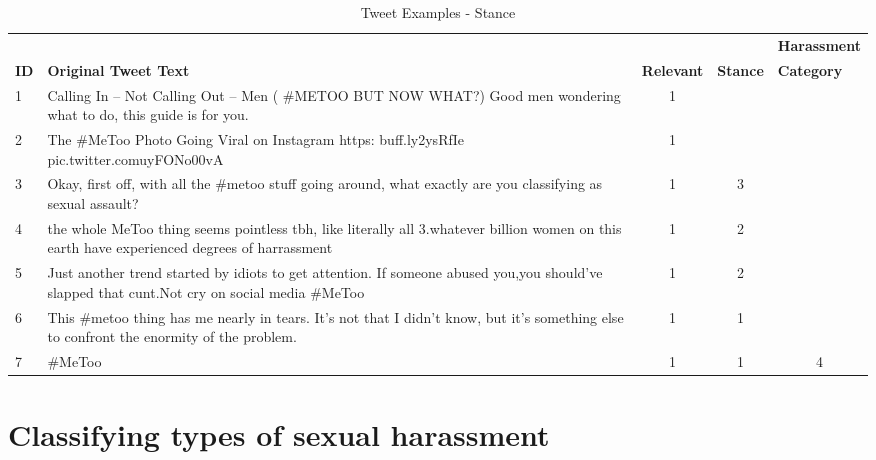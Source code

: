 \begin{table}[H]
    \centering
    \caption{Tweet Examples - Stance}
    \begin{tabular}{m{1cm} m{8cm} m{1.5cm} m{1.1cm} m{2.1cm}}
        \toprule
        & {} & {} & {} & {\textbf{Harassment}} \\
        \rowcolor{White}\textbf{ID} & {\textbf{Original Tweet Text}} & {\textbf{Relevant}} & {\textbf{Stance}} & {\textbf{Category}} \\
                \midrule
        1 & {Calling In – Not Calling Out – Men ( \#METOO BUT NOW WHAT?) Good men wondering what to do, this guide is for you.} & \multicolumn{1}{c}{1} & \multicolumn{1}{c}{ } & \multicolumn{1}{c}{ }\\
        2 & {The \#MeToo Photo Going Viral on Instagram https:\/\/ buff.ly\/2ysRfIe pic.twitter.com\/uyFONo00vA}  & \multicolumn{1}{c}{1} & \multicolumn{1}{c}{ } & \multicolumn{1}{c}{ }\\
        3 & {Okay, first off, with all the \#metoo stuff going around, what exactly are you classifying as sexual assault?} & \multicolumn{1}{c}{1} & \multicolumn{1}{c}{3} & \multicolumn{1}{c}{ }\\
        4 & {the whole MeToo thing seems pointless tbh, like literally all 3.whatever billion women on this earth have experienced degrees of harrassment} & \multicolumn{1}{c}{1} & \multicolumn{1}{c}{2} & \multicolumn{1}{c}{ }\\
        5 & {Just another trend started by idiots to get attention. If someone abused you,you should've slapped that cunt.Not cry on social media \#MeToo} & \multicolumn{1}{c}{1} & \multicolumn{1}{c}{2} & \multicolumn{1}{c}{ }\\
        6 & {This \#metoo thing has me nearly in tears. It's not that I didn't know, but it's something else to confront the enormity of the problem.} & \multicolumn{1}{c}{1} & \multicolumn{1}{c}{1} & \multicolumn{1}{c}{}\\
        7 & {\#MeToo} & \multicolumn{1}{c}{1} & \multicolumn{1}{c}{1} & \multicolumn{1}{c}{4}\\
        \bottomrule
    \end{tabular}
\end{table}

\section{Classifying types of sexual harassment}

